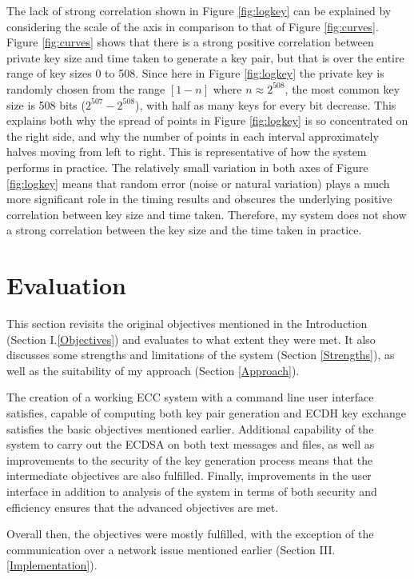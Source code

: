 \documentclass[12pt,a4paper]{article}
\begin{document}
The lack of strong correlation shown in Figure \ref{fig:logkey} can be explained by considering the scale of the axis in comparison to that of 
Figure \ref{fig:curves}. 
Figure \ref{fig:curves} shows that there is a strong positive correlation between private key size and time taken to generate a key pair, 
but that is over the entire range of key sizes 0 to 508. 
Since here in Figure \ref{fig:logkey} the private key is randomly chosen from the range $[1-n]$ where $n \approx 2^{508}$, 
the most common key size is 508 bits ($2^{507}-2^{508}$), with half as many keys for every bit decrease. 
This explains both why the spread of points in Figure \ref{fig:logkey} is so concentrated on the right side, 
and why the number of points in each interval approximately halves moving from left to right. 
This is representative of how the system performs in practice. 
The relatively small variation in both axes of Figure \ref{fig:logkey} means that random error (noise or natural variation) 
plays a much more significant role in the timing results and obscures the underlying positive correlation between key size and time taken. 
Therefore, my system does not show a strong correlation between the key size and the time taken in practice. 



\section{Evaluation} \noindent
This section revisits the original objectives mentioned in the Introduction (Section I.\ref{Objectives}) and evaluates to what extent they were met. 
It also discusses some strengths and limitations of the system (Section \ref{Strengths}), as well as the suitability of my approach (Section \ref{Approach}). 

The creation of a working ECC system with a command line user interface satisfies, 
capable of computing both key pair generation and ECDH key exchange satisfies the basic objectives mentioned earlier. 
Additional capability of the system to carry out the ECDSA on both text messages and files, 
as well as improvements to the security of the key generation process means that the intermediate objectives are also fulfilled. 
Finally, improvements in the user interface in addition to analysis of the system in terms of both security and efficiency ensures that the advanced objectives are met. 

Overall then, the objectives were mostly fulfilled, with the exception of the communication over a network issue mentioned earlier (Section III.\ref{Implementation}). 
\end{document}
